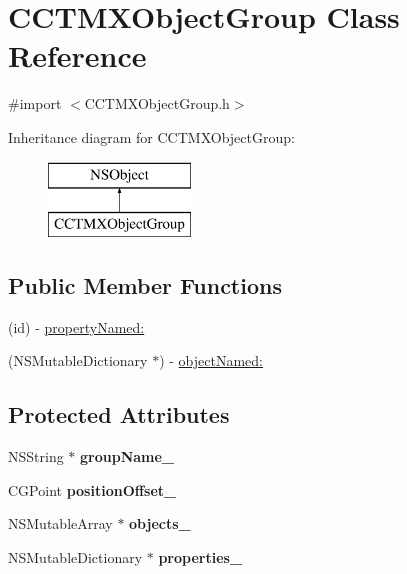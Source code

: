 \hypertarget{interface_c_c_t_m_x_object_group}{\section{C\-C\-T\-M\-X\-Object\-Group Class Reference}
\label{interface_c_c_t_m_x_object_group}
}


{\ttfamily \#import $<$C\-C\-T\-M\-X\-Object\-Group.\-h$>$}

Inheritance diagram for C\-C\-T\-M\-X\-Object\-Group\-:\begin{figure}[H]
\begin{center}
\leavevmode
\includegraphics[height=2.000000cm]{interface_c_c_t_m_x_object_group}
\end{center}
\end{figure}
\subsection*{Public Member Functions}
\begin{DoxyCompactItemize}
\item 
(id) -\/ \hyperlink{interface_c_c_t_m_x_object_group_a53169aab66912c9fa7e077fa3af0a5d5}{property\-Named\-:}
\item 
(N\-S\-Mutable\-Dictionary $\ast$) -\/ \hyperlink{interface_c_c_t_m_x_object_group_a83762883e29d2227b03e1133537dad09}{object\-Named\-:}
\end{DoxyCompactItemize}
\subsection*{Protected Attributes}
\begin{DoxyCompactItemize}
\item 
\hypertarget{interface_c_c_t_m_x_object_group_a7d2696dfb1ff2c595f64635725402a5c}{N\-S\-String $\ast$ {\bfseries group\-Name\-\_\-}}\label{interface_c_c_t_m_x_object_group_a7d2696dfb1ff2c595f64635725402a5c}

\item 
\hypertarget{interface_c_c_t_m_x_object_group_a13c9c631ca6d7f2da2867ba6e5ed9b3d}{C\-G\-Point {\bfseries position\-Offset\-\_\-}}\label{interface_c_c_t_m_x_object_group_a13c9c631ca6d7f2da2867ba6e5ed9b3d}

\item 
\hypertarget{interface_c_c_t_m_x_object_group_af95f55341b789b52c72d0abaa44041d5}{N\-S\-Mutable\-Array $\ast$ {\bfseries objects\-\_\-}}\label{interface_c_c_t_m_x_object_group_af95f55341b789b52c72d0abaa44041d5}

\item 
\hypertarget{interface_c_c_t_m_x_object_group_a6fcd93a8a7cbef404fb1a41de8830c60}{N\-S\-Mutable\-Dictionary $\ast$ {\bfseries properties\-\_\-}}\label{interface_c_c_t_m_x_object_group_a6fcd93a8a7cbef404fb1a41de8830c60}

\end{DoxyCompactItemize}
